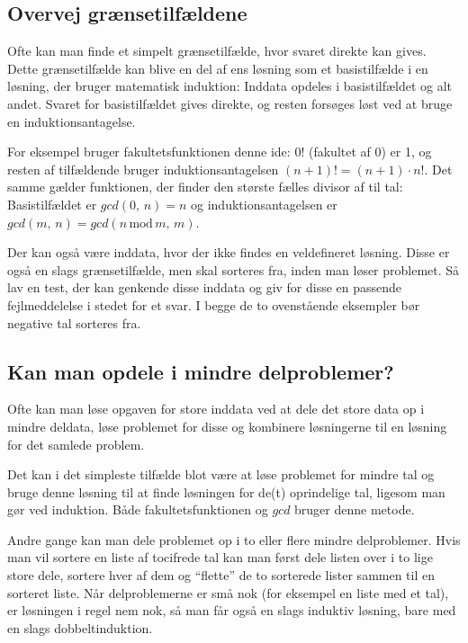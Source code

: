 \documentclass[a4paper,12pt]{article}
\begin{document}
\subsection*{Overvej grænsetilfældene}

Ofte kan man finde et simpelt grænsetilfælde, hvor svaret direkte kan
gives.  Dette grænsetilfælde kan blive en del af ens løsning som et
basistilfælde i en løsning, der bruger matematisk induktion: Inddata
opdeles i basistilfældet og alt andet.  Svaret for basistilfældet
gives direkte, og resten forsøges løst ved at bruge en
induktionsantagelse.

For eksempel bruger fakultetsfunktionen denne ide: $0!$ (fakultet af
0) er 1, og resten af tilfældende bruger induktionsantagelsen $(n+1)!
= (n+1)\cdot n!$.  Det samme gælder funktionen, der finder den største
fælles divisor af til tal: Basistilfældet er $gcd (0,\,n) = n$ og
induktionsantagelsen er $gcd(m,\,n) = gcd(n\,\textrm{mod}\,m,\, m)$.

Der kan også være inddata, hvor der ikke findes en veldefineret
løsning.  Disse er også en slags grænsetilfælde, men skal sorteres
fra, inden man løser problemet.  Så lav en test, der kan genkende
disse inddata og giv for disse en passende fejlmeddelelse i stedet for
et svar.  I begge de to ovenstående eksempler bør negative tal
sorteres fra.

\subsection*{Kan man opdele i mindre delproblemer?}

Ofte kan man løse opgaven for store inddata ved at dele det store data
op i mindre deldata, løse problemet for disse og kombinere løsningerne
til en løsning for det samlede problem.

Det kan i det simpleste tilfælde blot være at løse problemet for
mindre tal og bruge denne løsning til at finde løsningen for de(t)
oprindelige tal, ligesom man gør ved induktion.  Både
fakultetsfunktionen og $gcd$ bruger denne metode.

Andre gange kan man dele problemet op i to eller flere mindre
delproblemer.  Hvis man vil sortere en liste af tocifrede tal kan man
først dele listen over i to lige store dele, sortere hver af dem og
``flette'' de to sorterede lister sammen til en sorteret liste.  Når
delproblemerne er små nok (for eksempel en liste med et tal), er
løsningen i regel nem nok, så man får også en slags induktiv løsning,
bare med en slags dobbeltinduktion.
\end{document}
